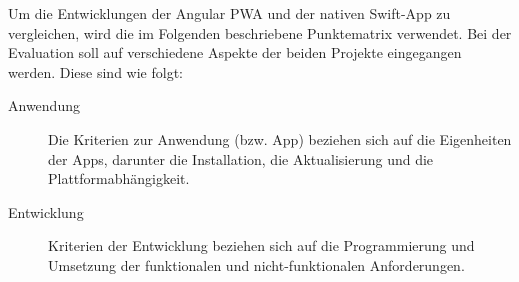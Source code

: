 Um die Entwicklungen der Angular PWA und der nativen Swift-App zu vergleichen, wird die im Folgenden beschriebene Punktematrix verwendet. Bei der Evaluation soll auf verschiedene Aspekte der beiden Projekte eingegangen werden. Diese sind wie folgt:
\begin{description}
	\item [Anwendung]
		Die Kriterien zur Anwendung (bzw. App) beziehen sich auf die Eigenheiten der Apps, darunter die Installation, die Aktualisierung und die Plattformabhängigkeit.
		
	\item [Entwicklung]
		Kriterien der Entwicklung beziehen sich auf die Programmierung und Umsetzung der funktionalen und nicht-funktionalen Anforderungen.
		
		
\end{description}

